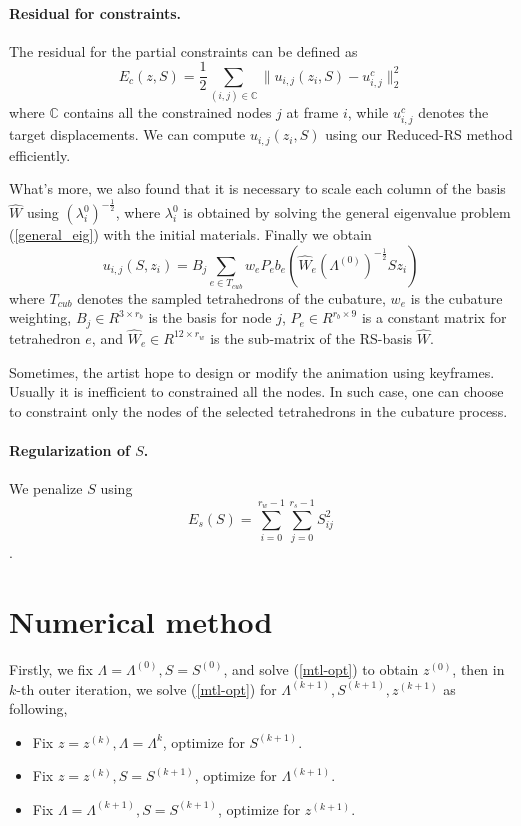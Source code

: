\documentclass[9pt,twocolumn]{extarticle}
\begin{document}
\paragraph{Residual for constraints. } The residual for the partial constraints
can be defined as
\begin{equation} \label{ec}
  E_c(z,S) = \frac{1}{2}\sum_{(i,j)\in \mathbb{C}}\|u_{i,j}(z_i,S)-u^c_{i,j}\|_2^2
\end{equation}
where $\mathbb{C}$ contains all the constrained nodes $j$ at frame $i$, while
$u^c_{i,j}$ denotes the target displacements. We can compute $u_{i,j}(z_i,S)$
using our Reduced-RS method efficiently. 

What's more, we also found that it is necessary to scale each column of the
basis $\hat{W}$ using ${(\lambda_i^{0})^{-\frac{1}{2}}}$, where $\lambda_i^{0}$
is obtained by solving the general eigenvalue problem (\ref{general_eig}) with
the initial materials.  Finally we obtain
\begin{equation}
  u_{i,j}(S,z_i)=B_j\sum_{e\in T_{cub}}w_eP_eb_e(\hat{W}_e(\Lambda^{(0)})^{-\frac{1}{2}}Sz_i)
\end{equation}
where $T_{cub}$ denotes the sampled tetrahedrons of the cubature, $w_e$ is the
cubature weighting, $B_j\in R^{3\times r_b}$ is the basis for node $j$, $P_e\in
R^{r_b\times9}$ is a constant matrix for tetrahedron $e$, and $\hat{W}_e\in
R^{12\times r_w}$ is the sub-matrix of the RS-basis $\hat{W}$.

Sometimes, the artist hope to design or modify the animation using keyframes.
Usually it is inefficient to constrained all the nodes. In such case, one can
choose to constraint only the nodes of the selected tetrahedrons in the
cubature process.

\paragraph{Regularization of $S$. }
We penalize $S$ using
\begin{equation} \label{reg_s}
  E_s(S) = \sum_{i=0}^{r_w-1}\sum_{j=0}^{r_s-1} S^2_{i j}
\end{equation}.

\section{Numerical method}\label{sec:numer-optim}
Firstly, we fix $\Lambda=\Lambda^{(0)}, S=S^{(0)}$, and
solve (\ref{mtl-opt}) to obtain $z^{(0)}$, then in $k$-th outer iteration, we
solve (\ref{mtl-opt}) for $\Lambda^{(k+1)},S^{(k+1)},z^{(k+1)}$ as following,
\begin{itemize}
\item Fix $z=z^{(k)},\Lambda=\Lambda^{k}$, optimize for $S^{(k+1)}$.
\item Fix $z=z^{(k)},S=S^{(k+1)}$, optimize for $\Lambda^{(k+1)}$.
\item Fix $\Lambda=\Lambda^{(k+1)},S=S^{(k+1)}$, optimize for $z^{(k+1)}$.
\end{itemize}
\end{document}
